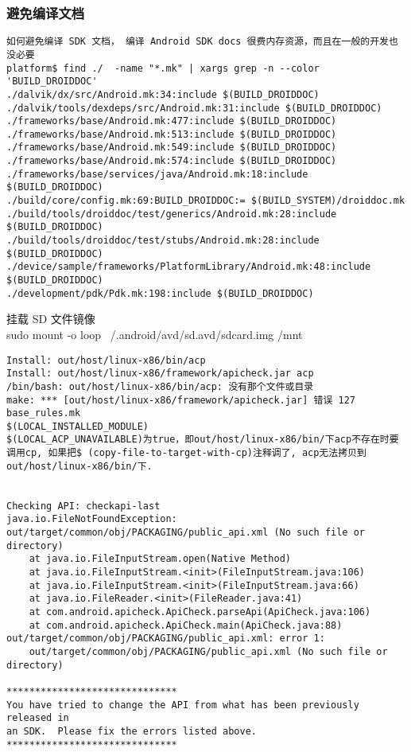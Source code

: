 \documentclass[a4paper,titlepage]{article}
\begin{document}
\subsubsection{避免编译文档}
\begin{verbatim}
如何避免编译 SDK 文档， 编译 Android SDK docs 很费内存资源，而且在一般的开发也没必要
platform$ find ./  -name "*.mk" | xargs grep -n --color 'BUILD_DROIDDOC'
./dalvik/dx/src/Android.mk:34:include $(BUILD_DROIDDOC)
./dalvik/tools/dexdeps/src/Android.mk:31:include $(BUILD_DROIDDOC)
./frameworks/base/Android.mk:477:include $(BUILD_DROIDDOC)
./frameworks/base/Android.mk:513:include $(BUILD_DROIDDOC)
./frameworks/base/Android.mk:549:include $(BUILD_DROIDDOC)
./frameworks/base/Android.mk:574:include $(BUILD_DROIDDOC)
./frameworks/base/services/java/Android.mk:18:include $(BUILD_DROIDDOC)
./build/core/config.mk:69:BUILD_DROIDDOC:= $(BUILD_SYSTEM)/droiddoc.mk
./build/tools/droiddoc/test/generics/Android.mk:28:include $(BUILD_DROIDDOC)
./build/tools/droiddoc/test/stubs/Android.mk:28:include $(BUILD_DROIDDOC)
./device/sample/frameworks/PlatformLibrary/Android.mk:48:include $(BUILD_DROIDDOC)
./development/pdk/Pdk.mk:198:include $(BUILD_DROIDDOC)
\end{verbatim}


挂载 SD 文件镜像\\
sudo mount -o loop ~/.android/avd/sd.avd/sdcard.img /mnt

\begin{verbatim}
Install: out/host/linux-x86/bin/acp 
Install: out/host/linux-x86/framework/apicheck.jar acp 
/bin/bash: out/host/linux-x86/bin/acp: 没有那个文件或目录 
make: *** [out/host/linux-x86/framework/apicheck.jar] 错误 127 
base_rules.mk  
$(LOCAL_INSTALLED_MODULE)  
$(LOCAL_ACP_UNAVAILABLE)为true，即out/host/linux-x86/bin/下acp不存在时要调用cp, 如果把$ (copy-file-to-target-with-cp)注释调了, acp无法拷贝到out/host/linux-x86/bin/下.


Checking API: checkapi-last 
java.io.FileNotFoundException: out/target/common/obj/PACKAGING/public_api.xml (No such file or directory) 
	at java.io.FileInputStream.open(Native Method) 
	at java.io.FileInputStream.<init>(FileInputStream.java:106) 
	at java.io.FileInputStream.<init>(FileInputStream.java:66) 
	at java.io.FileReader.<init>(FileReader.java:41) 
	at com.android.apicheck.ApiCheck.parseApi(ApiCheck.java:106) 
	at com.android.apicheck.ApiCheck.main(ApiCheck.java:88) 
out/target/common/obj/PACKAGING/public_api.xml: error 1: 
    out/target/common/obj/PACKAGING/public_api.xml (No such file or directory)

****************************** 
You have tried to change the API from what has been previously released in 
an SDK.  Please fix the errors listed above. 
****************************** 

\end{verbatim}
\end{document}
